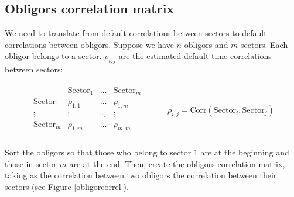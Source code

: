 \documentclass[a4paper,12pt,final]{article}
\begin{document}
\subsection{Obligors correlation matrix}
\label{tcorrel}
We need to translate from default correlations between sectors to default 
correlations between obligors. Suppose we have $n$ obligors and $m$ 
sectors. Each obligor belongs to a sector. $\rho_{i,j}$ are the estimated 
default time correlations between sectors:

\begin{center}
\begin{displaymath}
\begin{array}{cc}
\begin{array}{c|ccc}
                    & \mathrm{Sector}_1 & \dots  & \mathrm{Sector}_{m} \\
\hline
\mathrm{Sector}_1   & \rho_{1,1}        & \dots  & \rho_{1,m} \\
\vdots              & \vdots            & \ddots & \vdots     \\
\mathrm{Sector}_{m} & \rho_{1,m}        & \dots  & \rho_{m,m} \\
\end{array}
&
\qquad \rho_{i,j} = \mathrm{Corr}(\mathrm{Sector}_i, \mathrm{Sector}_j)
\end{array}
\end{displaymath}
\end{center}

Sort the obligors so that those who belong to sector $1$ are at the beginning 
and those in sector $m$ are at the end. Then, create the obligors correlation 
matrix, taking as the correlation between two obligors the correlation between 
their sectors (see Figure \ref{obligorcorrel}).
\end{document}
